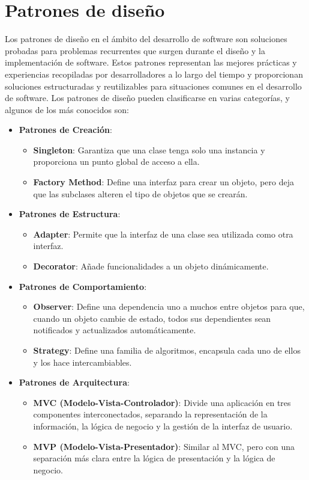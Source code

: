 \section{Patrones de diseño}
Los patrones de diseño en el ámbito del desarrollo de software 
son soluciones probadas para problemas recurrentes que surgen 
durante el diseño y la implementación de software. 
Estos patrones representan las mejores prácticas y experiencias 
recopiladas por desarrolladores a lo largo del tiempo y 
proporcionan soluciones estructuradas y reutilizables 
para situaciones comunes en el desarrollo de software.
Los patrones de diseño pueden clasificarse en varias categorías, 
y algunos de los más conocidos son:
\begin{itemize}
	\item \textbf{Patrones de Creación}:
	\begin{itemize}
		\item \textbf{Singleton}: Garantiza que una clase tenga solo una instancia y proporciona un punto global de acceso a ella.
		\item \textbf{Factory Method}: Define una interfaz para crear un objeto, pero deja que las subclases alteren el tipo de objetos que se crearán.
	\end{itemize}
	\item \textbf{Patrones de Estructura}:
	\begin{itemize}
		\item \textbf{Adapter}: Permite que la interfaz de una clase sea utilizada como otra interfaz.
		\item \textbf{Decorator}: Añade funcionalidades a un objeto dinámicamente.
	\end{itemize}
	\item \textbf{Patrones de Comportamiento}:
	\begin{itemize}
		\item \textbf{Observer}: Define una dependencia uno a muchos entre objetos para que, cuando un objeto cambie de estado, todos sus dependientes sean notificados y actualizados automáticamente.
		\item \textbf{Strategy}: Define una familia de algoritmos, encapsula cada uno de ellos y los hace intercambiables.
	\end{itemize}
	\item \textbf{Patrones de Arquitectura}:
	\begin{itemize}
		\item \textbf{MVC (Modelo-Vista-Controlador)}: Divide una aplicación en tres componentes interconectados, separando la representación de la información, la lógica de negocio y la gestión de la interfaz de usuario.
		\item \textbf{MVP (Modelo-Vista-Presentador)}: Similar al MVC, pero con una separación más clara entre la lógica de presentación y la lógica de negocio.
	\end{itemize}
\end{itemize}

